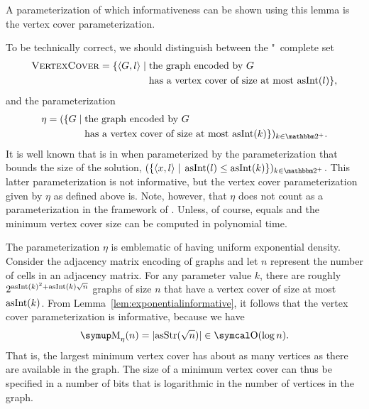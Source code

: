 A parameterization of which informativeness can be shown using this lemma is the vertex cover parameterization.
\begin{example}
\label{ex:vc_informative}%
  To be technically correct, we should distinguish between the "~complete \parencite{garey1979computers} set
  \begin{align*}
    \defkeyat{VertexCover@\pr{VertexCover}}{\pr{VertexCover}} \deq \{\pair{G}{l} \st &\text{the graph encoded by $G$} \\
    	&\text{has a vertex cover of size at most $\asNat(l)$}\},
  \end{align*}
  and the parameterization
  \begin{align*}
    \eta \deq (\{G \st &\text{the graph encoded by $G$} \\
    	&\text{has a vertex cover of size at most $\asNat(k)$}\})_{k \in \binary^+}.
  \end{align*}
  It is well known that  is in  when parameterized by the parameterization that bounds the size of the solution, $(\{\pair{x}{l} \st \asNat(l) \le \asNat(k)\})_{k \in \binary^+}$.
  This latter parameterization is not informative, but the vertex cover parameterization given by $\eta$ as defined above is.
  Note, however, that $\eta$ does not count as a parameterization in the framework of \citeauthor{flum2006parameterized}.
  Unless, of course,  equals  and the minimum vertex cover size can be computed in polynomial time.

  The parameterization $\eta$ is emblematic of having uniform exponential density.
  Consider the adjacency matrix encoding of graphs and let $n$ represent the number of cells in an adjacency matrix.
  For any parameter value $k$, there are roughly $2^{\operatorname{asInt}(k)^2 + \operatorname{asInt}(k)\sqrt{n}}$ graphs of size $n$ that have a vertex cover of size at most $\operatorname{asInt}(k)$.
  From Lemma~\ref{lem:exponentialinformative}, it follows that the vertex cover parameterization is informative, because we have
  \begin{equation*}
    \upM_\eta(n) = \length{\asStr(\sqrt{n})} \in \bigO(\log n).
  \end{equation*}
  That is, the largest minimum vertex cover has about as many vertices as there are available in the graph.
  The size of a minimum vertex cover can thus be specified in a number of bits that is logarithmic in the number of vertices in the graph.
\end{example}

